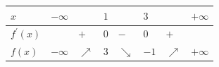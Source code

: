 \documentclass[border=.4pt]{standalone}
\begin{document}
\color{ink}\begin{tabular}{|>{\centering\arraybackslash}m{1.7cm}|>{\centering\arraybackslash}m{1.25cm}|>{\centering\arraybackslash}m{1.25cm}|>{\centering\arraybackslash}m{1.25cm}|>{\centering\arraybackslash}m{1.25cm}|>{\centering\arraybackslash}m{1.25cm}|>{\centering\arraybackslash}m{1.25cm}|>{\centering\arraybackslash}m{1.25cm}|}\hline
\cellcolor{head}$x$ & \cellcolor{head}$-\infty$ & \cellcolor{head} & \cellcolor{head}$1$ & \cellcolor{head} & \cellcolor{head}$3$ & \cellcolor{head} & \cellcolor{head}$+\infty$ \\ \hline
\cellcolor{head}$f^{\prime}(x)$ &  & $+$ & $0$ & $-$ & $0$ & $+$ &  \\ \hline
\cellcolor{head}$f(x)$ & $-\infty$ & \color{focus}\large $\nearrow$ & $3$ & \color{focus}\large $\searrow$ & $-1$ & \color{focus}\large $\nearrow$ & $+\infty$ \\ \hline\end{tabular}
\end{document}
